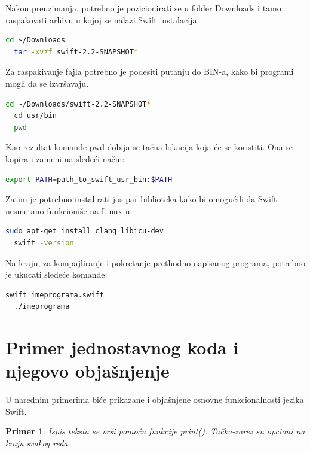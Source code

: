 \documentclass[a4paper]{article}
\newtheorem{primer}{Primer}[section]
\begin{document}
Nakon preuzimanja, potrebno je pozicionirati se u folder Downloads i tamo raspakovati arhivu u kojoj se nalazi Swift instalacija.

\begin{lstlisting}[language=bash, caption={Raspakovanje Swift instalacije}]
  cd ~/Downloads
  tar -xvzf swift-2.2-SNAPSHOT*
\end{lstlisting}

Za raspakivanje fajla potrebno je podesiti putanju do BIN-a, kako bi programi mogli da se izvršavaju.

\begin{lstlisting}[language=bash, caption={Podešavanje putanje do BIN-a}]
  cd ~/Downloads/swift-2.2-SNAPSHOT*
  cd usr/bin
  pwd
\end{lstlisting}

Kao rezultat komande pwd dobija se tačna lokacija koja će se koristiti. Ona se kopira i zameni na sledeći način:
\begin{lstlisting}[language=bash, caption={Kopiranje putanje}]
  export PATH=path_to_swift_usr_bin:$PATH
\end{lstlisting}

Zatim je potrebno instalirati jos par biblioteka kako bi omogućili da Swift nesmetano funkcioniše na Linux-u.

\begin{lstlisting}[language=bash, caption={Instalacija biblioteka}]
  sudo apt-get install clang libicu-dev
  swift -version
\end{lstlisting}

Na kraju, za kompajliranje i pokretanje prethodno napisanog programa, potrebno je ukucati sledeće komande:

\begin{lstlisting}[language=bash, caption={Komanda za kompajliranje}]
  swift imeprograma.swift
  ./imeprograma
\end{lstlisting}
 
\section{Primer jednostavnog koda i njegovo objašnjenje}	
\label{sec:sedmiDeo}
U narednim primerima biće prikazane i objašnjene osnovne funkcionalnosti jezika Swift.

\begin{primer}
Ispis teksta se vrši pomoću funkcije print(). Tačka-zarez su opcioni na kraju svakog reda.
\end{primer}
\end{document}
